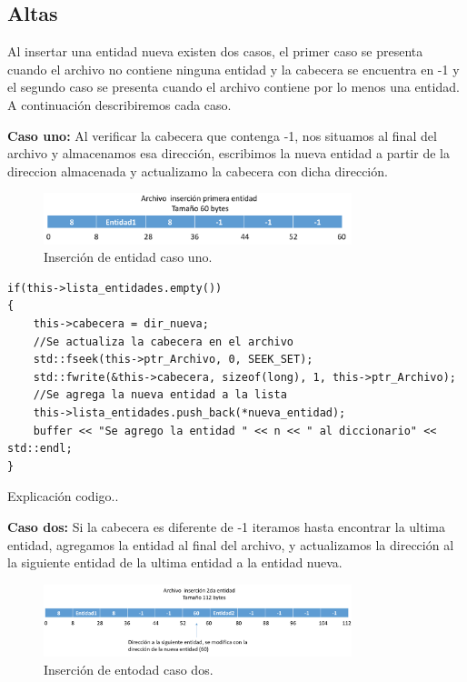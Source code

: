 \subsection{Altas}
Al insertar una entidad nueva existen dos casos, el primer caso se presenta cuando el archivo no contiene ninguna entidad y la 
cabecera se encuentra en -1 y el segundo caso se presenta cuando el archivo contiene por lo menos una entidad.
A continuación describiremos cada caso.

{\bf Caso uno: }Al verificar la cabecera que contenga -1, nos situamos al final del archivo y almacenamos esa dirección, escribimos la nueva entidad
a partir de la direccion almacenada y actualizamo la cabecera con dicha dirección.

\begin{figure}[!ht]
\begin{center}
  \includegraphics[width=0.8\textwidth]{secciones/ejemploA/img2.png}
  \caption{Inserción de entidad caso uno.}
\end{center}
\end{figure}

\begin{lstlisting}[frame=single]
if(this->lista_entidades.empty())
{
	this->cabecera = dir_nueva;
    //Se actualiza la cabecera en el archivo
    std::fseek(this->ptr_Archivo, 0, SEEK_SET);
    std::fwrite(&this->cabecera, sizeof(long), 1, this->ptr_Archivo);
    //Se agrega la nueva entidad a la lista
    this->lista_entidades.push_back(*nueva_entidad);
    buffer << "Se agrego la entidad " << n << " al diccionario" << std::endl;
}
\end{lstlisting}

Explicación codigo..

{\bf Caso dos: }Si la cabecera es diferente de -1 iteramos hasta encontrar la ultima entidad, agregamos la entidad al final del archivo, y actualizamos la dirección al la siguiente entidad de la ultima entidad a la entidad nueva.

\begin{figure}[!ht]
\begin{center}
  \includegraphics[width=0.8\textwidth]{secciones/ejemploA/img3.png}
  \caption{Inserción de entodad caso dos.}
\end{center}
\end{figure}

